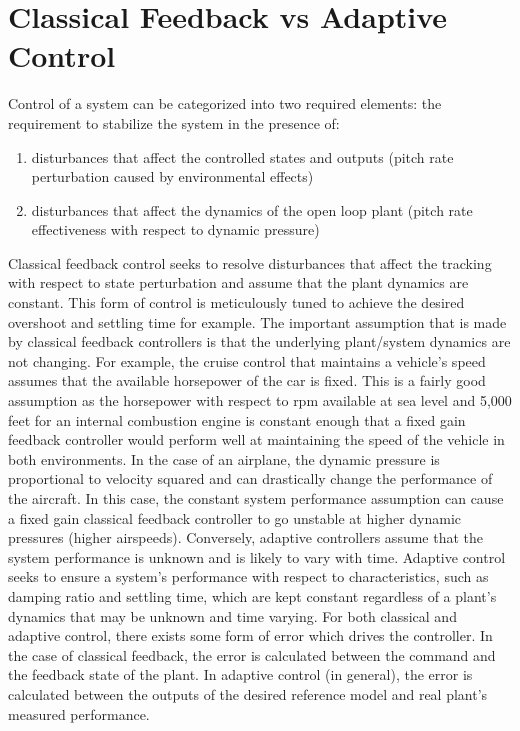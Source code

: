 \section{Classical Feedback vs Adaptive Control}
Control of a system can be categorized into two required elements: the requirement to stabilize the system in the presence of:
\begin{enumerate}
 \item disturbances that affect the controlled states and outputs (pitch rate perturbation caused by environmental effects)
 \item disturbances that affect the dynamics of the open loop plant (pitch rate effectiveness with respect to dynamic pressure)
\end{enumerate}
Classical feedback control seeks to resolve disturbances that affect the tracking with respect to state perturbation and assume that the plant dynamics are constant.  This form of control is meticulously tuned to achieve the desired overshoot and settling time for example.  The important assumption that is made by classical feedback controllers is that the underlying plant/system dynamics are not changing.  For example, the cruise control that maintains a vehicle's speed assumes that the available horsepower of the car is fixed.  This is a fairly good assumption as the horsepower with respect to rpm available at sea level and 5,000 feet for an internal combustion engine is constant enough that a fixed gain feedback controller would perform well at maintaining the speed of the vehicle in both environments.  In the case of an airplane, the dynamic pressure is proportional to velocity squared and can drastically change the performance of the aircraft.  In this case, the constant system performance assumption can cause a fixed gain classical feedback controller to go unstable at higher dynamic pressures (higher airspeeds).   Conversely, adaptive controllers assume that the system performance is unknown and is likely to vary with time.  Adaptive control seeks to ensure a system's performance with respect to characteristics, such as damping ratio and settling time, which are kept constant regardless of a plant's dynamics that may be unknown and time varying.  For both classical and adaptive control, there exists some form of error which drives the controller.  In the case of classical feedback, the error is calculated between the command and the feedback state of the plant. In adaptive control (in general), the error is calculated between the outputs of the desired reference model and real plant's measured performance.

